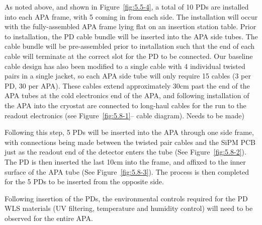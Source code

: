 As noted above, and shown in Figure~\ref{fig:5.5-4}, a total of 10 PDs are
installed into each APA frame, with 5 coming in from each side.  The
installation will occur with the fully-assembled APA frame lying flat
on an insertion station table.  Prior to installation, the PD cable
bundle will be inserted into the APA side tubes.  The cable bundle
will be pre-assembled prior to installation such that the end of each
cable will terminate at the correct slot for the PD to be connected.
Our baseline cable design has also been modified to a single cable
with 4 individual twisted pairs in a single jacket, so each APA side
tube will only require 15 cables (3 per PD, 30 per APA).  These cables
extend approximately 30cm past the end of the APA tubes at the cold
electronics end of the APA, and following installation of the APA into
the cryostat are connected to long-haul cables for the run to the
readout electronics (see Figure~\ref{fig:5.8-1}-- cable diagram).  Needs to be
made)

Following this step, 5 PDs will be inserted into the APA through one
side frame, with connections being made between the twisted pair
cables and the SiPM PCB just as the readout end of the detector enters
the tube (See Figure~\ref{fig:5.8-2}).  The PD is then inserted the last 10cm into
the frame, and affixed to the inner surface of the APA tube (See
Figure~\ref{fig:5.8-3}).  The process is then completed for the 5 PDs to be
inserted from the opposite side.

Following insertion of the PDs, the environmental controls required
for the PD WLS materials (UV filtering, temperature and humidity
control) will need to be observed for the entire APA.






